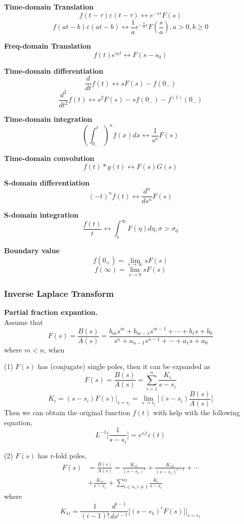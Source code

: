  {\bf Time-domain Translation}
 \[ f(t-\tau)\varepsilon(t-\tau) \leftrightarrow e^{-s\tau} F(s)\]
 \[ f(at-b)\varepsilon(at-b) \leftrightarrow \frac{1}{a} e^{-\frac{b}{a}s} F(\frac{s}{a}), a>0, b\geq 0\]

 {\bf Freq-domain Translation}
 \[ f(t)e^{s_0t} \leftrightarrow F(s-s_0)\]

 {\bf Time-domain differentiation}
 \[ \frac{d}{dt}f(t) \leftrightarrow sF(s) - f(0_-) \]
 \[ \frac{d^2}{dt^2}f(t) \leftrightarrow s^2F(s) - sf(0_-) - f^{(1)}(0_-)\]

 {\bf Time-domain integration}
 \[ (\int_{0_-}^t)^n f(x)dx \leftrightarrow \frac{1}{s^n} F(s)\]

 {\bf Time-domain convolution}
 \[ f(t) * g(t) \leftrightarrow F(s)G(s)\]

 {\bf S-domain differentiation}
 \[ (-t)^nf(t) \leftrightarrow \frac{d^n}{ds^n}F(s)\]

 {\bf S-domain integration}
 \[ \frac{f(t)}{t} \leftrightarrow \int_{s}^\infty F(\eta)d\eta, \sigma > \sigma_0\]

 {\bf Boundary value}
 \[ f(0_+) = \lim_{s \to \infty} sF(s)\]
 \[ f(\infty) = \lim_{s \to 0} sF(s)\]

 \subsubsection{Inverse Laplace Transform}

 {\bf Partial fraction expantion.}\\
 Assume that
 \[ F(s) = \frac{B(s)}{A(s)} = \frac{b_ms^m + b_{m-1}s^{m-1} + \cdots + b_1s + b_0}
 {s^n + a_{n-1}s^{n-1} + \cdots + a_1s + a_0 } \]
 where $m<n$, when

 (1) $F(s)$ has (conjugate) single poles, then it can be expanded as
 \[ F(s) = \frac{B(s)}{A(s)} = \sum_{i=1}^{n} \frac{K_i}{s-s_i} \]
 \[ K_i = (s-s_i)F(s)|_{s=s_i} = \lim_{s\to s_i} \Big[ (s-s_i) \frac{B(s)}{A(s)} \Big] \]
 Then we can obtain the original function $f(t)$ with help with the following equation,
 \[ \mathit{L}^{-1}\big[ \frac{1}{s-s_i} \big] = e^{s_i t}\varepsilon(t)\]

 (2) $F(s)$ has r-fold poles,
 \begin{align*} F(s) &= \frac{B(s)}{A(s)} = \frac{K_{11}}{(s-s_1)^r} + \frac{K_{12}}{(s-s_1)^{r-1}} + \cdots \\
					 &+ \frac{K_{1r}}{s-s_1} + \sum_{i\in n, i\neq 1}^{n} \frac{K_i}{s-s_i}
 \end{align*}
 where
 \[ K_{1i} = \frac{1}{(i-1)!} \frac{d^{i-1}}{ds^{i-1}} \big[ (s-s_1)^r F(s)\big] \Big|_{s=s_1} \]

